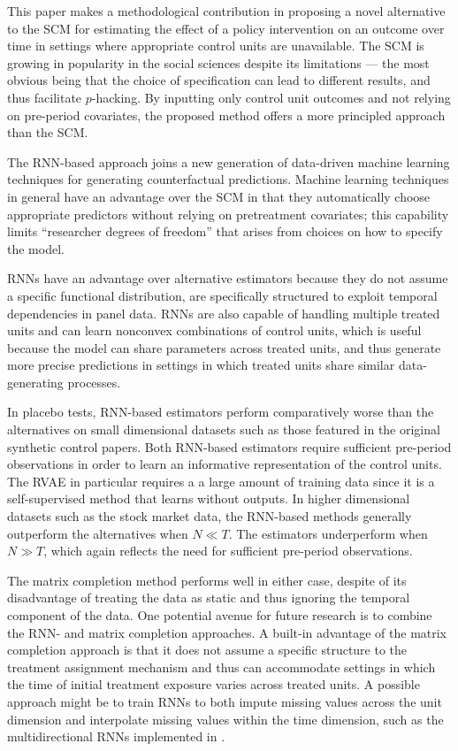\documentclass[hidelinks,12pt]{article}
\begin{document}
This paper makes a methodological contribution in proposing a novel alternative to the SCM for estimating the effect of a policy intervention on an outcome over time in settings where appropriate control units are unavailable. The SCM is growing in popularity in the social sciences despite its limitations --- the most obvious being that the choice of specification can lead to different results, and thus facilitate $p$-hacking. By inputting only control unit outcomes and not relying on pre-period covariates, the proposed method offers a more principled approach than the SCM. 

The RNN-based approach joins a new generation of data-driven machine learning techniques for generating counterfactual predictions. Machine learning techniques in general have an advantage over the SCM in that they automatically choose appropriate predictors without relying on pretreatment covariates; this capability limits ``researcher degrees of freedom'' that arises from choices on how to specify the model. 

RNNs have an advantage over alternative estimators because they do not assume a specific functional distribution, are specifically structured to exploit temporal dependencies in panel data. RNNs are also capable of handling multiple treated units and can learn nonconvex combinations of control units, which is useful because the model can share parameters across treated units, and thus generate more precise predictions in settings in which treated units share similar data-generating processes. 

In placebo tests, RNN-based estimators perform comparatively worse than the alternatives on small dimensional datasets such as those featured in the original synthetic control papers. Both RNN-based estimators require sufficient pre-period observations in order to learn an informative representation of the control units. The RVAE in particular requires a a large amount of training data since it is a self-supervised method that learns without outputs. In higher dimensional datasets such as the stock market data, the RNN-based methods generally outperform the alternatives when  $N \ll T$. The estimators underperform when $N \gg T$, which again reflects the need for sufficient pre-period observations. 

The matrix completion method performs well in either case, despite of its disadvantage of treating the data as static and thus ignoring the temporal component of the data. One potential avenue for future research is to combine the RNN- and matrix completion approaches. A built-in advantage of the matrix completion approach is that it does not assume a specific structure to the treatment assignment mechanism and thus can accommodate settings in which the time of initial treatment exposure varies across treated units. A possible approach might be to train RNNs to both impute missing values across the unit dimension and interpolate missing values within the time dimension, such as the multidirectional RNNs implemented in \citet{yoon2018estimating}. 
\end{document}
